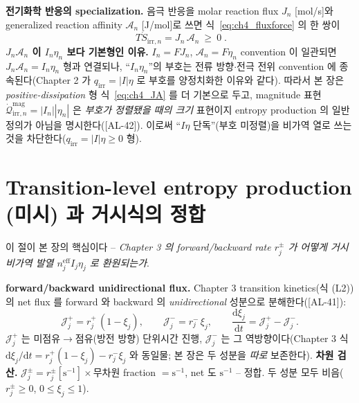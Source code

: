\documentclass[11pt,a4paper]{article}
\newcommand{\dd}{\mathrm{d}}
\newcommand{\eff}{\mathrm{eff}}
\newcommand{\irr}{\mathrm{irr}}
\newcommand{\AL}[1]{\textsf{[AL-#1]}}
\begin{document}
\textbf{전기화학 반응의 specialization.} 음극 반응을 molar reaction flux $J_n$ [mol/s]와 generalized reaction
affinity $\mathcal A_n$ [J/mol]로 쓰면 식~\eqref{eq:ch4_fluxforce} 의 한 쌍이
\begin{equation}
\boxed{\;T\dot S_{\irr,n}=J_n\,\mathcal A_n\ \ge\ 0\;.}
\label{eq:ch4_JA}
\end{equation}
\textbf{$J_n\mathcal A_n$ 이 $I_n\eta_n$ 보다 기본형인 이유.} $I_n=FJ_n$, $\mathcal A_n=F\eta_n$ convention 이
일관되면 $J_n\mathcal A_n=I_n\eta_n$ 형과 연결되나, ``$I_n\eta_n$''의 부호는 전류 방향$\cdot$전극 전위
convention 에 종속된다(Chapter 2 가 $q_\irr=|I|\eta$ 로 부호를 양정치화한 이유와 같다). 따라서 본 장은
\emph{positive-dissipation} 형 식~\eqref{eq:ch4_JA} 를 더 기본으로 두고, magnitude 표현
$\dot{\mathcal Q}_{\irr,n}^{\mathrm{mag}}=|I_n||\eta_n|$ 은 \emph{부호가 정렬됐을 때의 크기} 표현이지 entropy
production 의 일반 정의가 아님을 명시한다(\AL{42}). 이로써 ``$I\eta$ 단독''(부호 미정렬)을 비가역 열로 쓰는
것을 차단한다($q_\irr=|I|\eta\ge0$ 형).

\section{Transition-level entropy production (미시) 과 거시식의 정합}\label{sec:ch4_tr}
이 절이 본 장의 핵심이다 -- \emph{Chapter 3 의 forward/backward rate $r_j^\pm$ 가 어떻게 거시 비가역 발열
$n_j^{\eff}I_j\eta_j$ 로 환원되는가}.

\textbf{forward/backward unidirectional flux.} Chapter 3 transition kinetics(식 (L2))의 net flux 를 forward 와
backward 의 \emph{unidirectional} 성분으로 분해한다(\AL{41}):
\begin{equation}
\mathcal J_j^+=r_j^+\,(1-\xi_j),\qquad \mathcal J_j^-=r_j^-\,\xi_j,\qquad
\frac{\dd\xi_j}{\dd t}=\mathcal J_j^+-\mathcal J_j^-.
\label{eq:ch4_Jpm}
\end{equation}
$\mathcal J_j^+$ 는 미점유$\to$점유(방전 방향) 단위시간 진행, $\mathcal J_j^-$ 는 그 역방향이다(Chapter 3
식 $\dd\xi_j/\dd t=r_j^+(1-\xi_j)-r_j^-\xi_j$ 와 동일물; 본 장은 두 성분을 \emph{따로} 보존한다). \textbf{차원
검산.} $\mathcal J_j^\pm=r_j^\pm[\mathrm{s^{-1}}]\times$무차원 fraction $=\mathrm{s^{-1}}$, net 도 $\mathrm{s^{-1}}$
-- 정합. 두 성분 모두 비음($r_j^\pm\ge0$, $0\le\xi_j\le1$).
\end{document}
